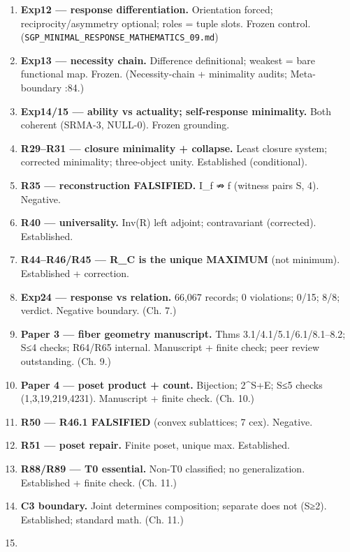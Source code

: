 \documentclass[
  11pt,
]{book}
\providecommand{\tightlist}{%
  \setlength{\itemsep}{0pt}\setlength{\parskip}{0pt}}
\begin{document}
\begin{enumerate}
\def\labelenumi{\arabic{enumi}.}
\tightlist
\item
  \textbf{Exp12 --- response differentiation.} Orientation forced;
  reciprocity/asymmetry optional; roles = tuple slots. Frozen control.
  (\texttt{SGP\_MINIMAL\_RESPONSE\_MATHEMATICS\_09.md})
\item
  \textbf{Exp13 --- necessity chain.} Difference definitional; weakest =
  bare functional map. Frozen. (Necessity-chain + minimality audits;
  Meta-boundary :84.)
\item
  \textbf{Exp14/15 --- ability vs actuality; self-response minimality.}
  Both coherent (SRMA-3, NULL-0). Frozen grounding.
\item
  \textbf{R29--R31 --- closure minimality + collapse.} Least closure
  system; corrected minimality; three-object unity. Established
  (conditional).
\item
  \textbf{R35 --- reconstruction FALSIFIED.} I\_f ⇏ f (witness pairs
  \textbar S, 4). Negative.
\item
  \textbf{R40 --- universality.} Inv(R) left adjoint; contravariant
  (corrected). Established.
\item
  \textbf{R44--R46/R45 --- R\_C is the unique MAXIMUM} (not minimum).
  Established + correction.
\item
  \textbf{Exp24 --- response vs relation.} 66,067 records; 0 violations;
  0/15; 8/8; verdict. Negative boundary. (Ch. 7.)
\item
  \textbf{Paper 3 --- fiber geometry manuscript.} Thms
  3.1/4.1/5.1/6.1/8.1--8.2; \textbar S\textbar≤4 checks; R64/R65
  internal. Manuscript + finite check; peer review outstanding. (Ch. 9.)
\item
  \textbf{Paper 4 --- poset product + count.} Bijection;
  2\^{}\textbar S\textbar+\textbar E\textbar; \textbar S\textbar≤5
  checks (1,3,19,219,4231). Manuscript + finite check. (Ch. 10.)
\item
  \textbf{R50 --- R46.1 FALSIFIED} (convex sublattices; 7 cex).
  Negative.
\item
  \textbf{R51 --- poset repair.} Finite poset, unique max. Established.
\item
  \textbf{R88/R89 --- T0 essential.} Non-T0 classified; no
  generalization. Established + finite check. (Ch. 11.)
\item
  \textbf{C3 boundary.} Joint determines composition; separate does not
  (\textbar S\textbar≥2). Established; standard math. (Ch. 11.)
\item

\end{enumerate}
\end{document}
